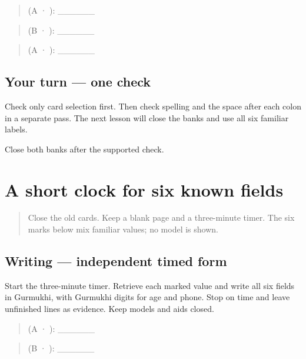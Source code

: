 \begin{quote}
 (A · ): \_\_\_\_\_\_
\end{quote}

\begin{quote}
 (B · ): \_\_\_\_\_\_
\end{quote}

\begin{quote}
 (A · ): \_\_\_\_\_\_
\end{quote}

\subsection*{Your turn — one check}
Check only card selection first. Then check spelling and the space after each colon in a separate pass. The next lesson will close the banks and use all six familiar labels.

\begin{tcolorbox}[breakable,colback=teal!4,colframe=teal!35!black,title={Before you move on}]
Close both banks after the supported check.
\end{tcolorbox}
\section[\texorpdfstring{\pa{ਨਾਂ}: · \pa{ਭਾਸ਼ਾ} … (short timed …)}{ਨਾਂ: · ਭਾਸ਼ਾ … (short timed …)}]{A short clock for six known fields}

\label{lesson:PA-W13-form-timed}



\begin{quote}
Close the old cards. Keep a blank page and a three-minute timer. The six marks below mix familiar values; no model is shown.
\end{quote}

\subsection*{Writing — independent timed form}
Start the three-minute timer. Retrieve each marked value and write all six fields in Gurmukhi, with Gurmukhi digits for age and phone. Stop on time and leave unfinished lines as evidence. Keep models and aids closed.

\begin{quote}
 (A · ): \_\_\_\_\_\_
\end{quote}

\begin{quote}
 (B · ): \_\_\_\_\_\_
\end{quote}

